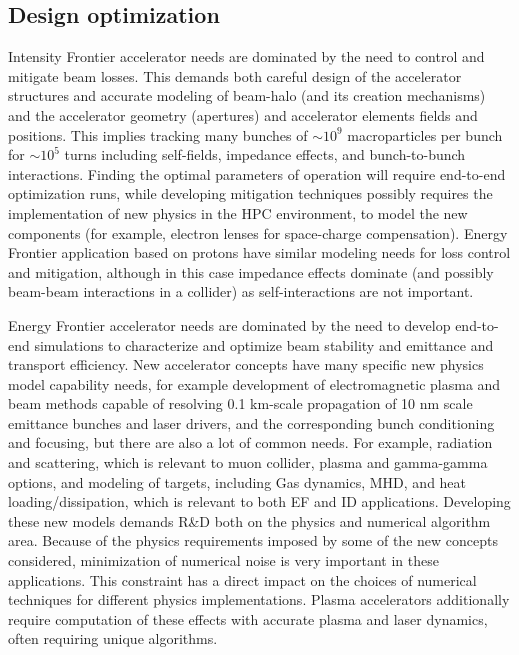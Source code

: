 \subsection{Design optimization}
Intensity Frontier accelerator needs are dominated by the need to
control and mitigate beam losses.  This demands both careful
design of the accelerator structures and accurate modeling of
beam-halo (and its creation mechanisms) and the accelerator
geometry (apertures) and accelerator elements fields and
positions.  This implies tracking many bunches of $\sim 10^9$
macroparticles per bunch for $\sim 10^5$ turns including
self-fields, impedance effects, and bunch-to-bunch interactions.
Finding the optimal parameters of operation will require
end-to-end  optimization runs, while developing mitigation
techniques possibly requires the implementation of new physics in the HPC
environment, to model the new components (for example, electron
lenses for space-charge compensation). Energy Frontier
application based on protons have similar modeling needs for loss
control and mitigation, although in this case impedance effects
dominate (and possibly beam-beam interactions in a collider) as
self-interactions are not important.

Energy Frontier accelerator needs are dominated by the need to
develop end-to-end simulations to characterize and optimize beam
stability and emittance and transport efficiency.  New
accelerator concepts have many specific new physics model
capability needs, for example development of electromagnetic
plasma and beam methods capable of resolving 0.1 km-scale
propagation of 10 nm scale emittance bunches and laser drivers,
and the corresponding bunch conditioning and focusing, but there
are also a lot of common needs.  For example, radiation and
scattering, which is relevant to muon collider, plasma and
gamma-gamma options, and modeling of targets,  including Gas
dynamics, MHD, and heat loading/dissipation,  which is relevant
to both EF and ID applications.  Developing these new models
demands R\&D both on the physics and numerical algorithm area.
Because of the physics requirements imposed by some of the new
concepts considered, minimization of numerical noise is very
important in these applications.  This constraint has a direct
impact on the choices of numerical techniques for different
physics implementations.  Plasma accelerators additionally require 
computation of these effects with accurate plasma and laser dynamics,
 often requiring unique algorithms.


